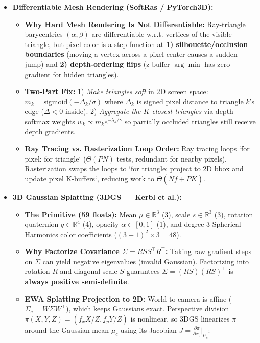 \documentclass[11pt,a4paper]{article}
\theoremstyle{definition}
\theoremstyle{plain}
\theoremstyle{remark}
\begin{document}
\begin{itemize}
    \item \textbf{Differentiable Mesh Rendering (SoftRas / PyTorch3D):}
    \begin{itemize}
        \item \textbf{Why Hard Mesh Rendering Is Not Differentiable:} Ray-triangle barycentrics $(\alpha, \beta)$ are differentiable w.r.t. vertices of the visible triangle, but pixel color is a step function at \textbf{1) silhouette/occlusion boundaries} (moving a vertex across a pixel center causes a sudden jump) and \textbf{2) depth-ordering flips} (z-buffer $\arg\min$ has zero gradient for hidden triangles).
        \item \textbf{Two-Part Fix:}
        1) \emph{Make triangles soft} in 2D screen space: $m_k = \text{sigmoid}(-\Delta_k / \sigma)$ where $\Delta_k$ is signed pixel distance to triangle $k$'s edge ($\Delta < 0$ inside).
        2) \emph{Aggregate the $K$ closest triangles} via depth-softmax weights $w_k \propto m_k e^{-\lambda_k / \gamma}$ so partially occluded triangles still receive depth gradients.
        \item \textbf{Ray Tracing vs. Rasterization Loop Order:} Ray tracing loops `for pixel: for triangle` ($\Theta(PN)$ tests, redundant for nearby pixels). Rasterization swaps the loops to `for triangle: project to 2D bbox and update pixel K-buffers`, reducing work to $\Theta(N\bar{f} + PK)$.
    \end{itemize}
    \item \textbf{3D Gaussian Splatting (3DGS --- Kerbl et al.):}
    \begin{itemize}
        \item \textbf{The Primitive (59 floats):} Mean $\mu \in \mathbb{R}^3$ (3), scale $s \in \mathbb{R}^3$ (3), rotation quaternion $q \in \mathbb{R}^4$ (4), opacity $\alpha \in [0,1]$ (1), and degree-3 Spherical Harmonics color coefficients ($(3+1)^2 \times 3 = 48$).
        \item \textbf{Why Factorize Covariance $\Sigma = R S S^\top R^\top$:} Taking raw gradient steps on $\Sigma$ can yield negative eigenvalues (invalid Gaussian). Factorizing into rotation $R$ and diagonal scale $S$ guarantees $\Sigma = (RS)(RS)^\top$ is \textbf{always positive semi-definite}.
        \item \textbf{EWA Splatting Projection to 2D:} World-to-camera is affine ($\Sigma_c = W\Sigma W^\top$), which keeps Gaussians exact. Perspective division $\pi(X,Y,Z) = (f_x X/Z, f_y Y/Z)$ is nonlinear, so 3DGS linearizes $\pi$ around the Gaussian mean $\mu_c$ using its Jacobian $J = \frac{\partial \pi}{\partial x_c}\big|_{\mu_c}$:

\end{itemize}
\end{itemize}
\end{document}
